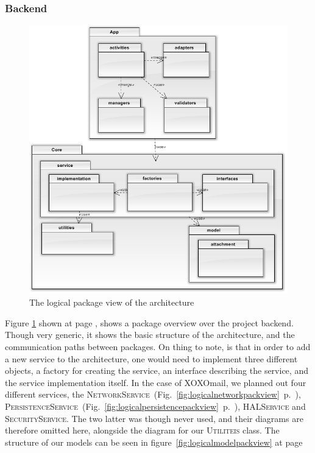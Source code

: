 	\subsubsection{Backend}
\begin{figure}[H]
	\includegraphics[width=\textwidth]{packageDiagram.png}
	\caption{The logical package view of the architecture}
	\label{fig:logicalpackview}
\end{figure}
Figure \ref{fig:logicalpackview} shown at page \pageref{fig:logicalpackview}, shows a package overview over the project backend. Though very generic, it shows the basic structure of the architecture, and the communication paths between packages. On thing to note, is that in order to add a new service to the architecture, one would need to implement three different objects, a factory for creating the service, an interface describing the service, and the service implementation itself. In the case of XOXOmail, we planned out four different services, the \textsc{NetworkService}~(Fig.~\ref{fig:logicalnetworkpackview}~p.~\pageref{fig:logicalnetworkpackview}), \textsc{PersistenceService}~(Fig.~\ref{fig:logicalpersistencepackview}~p.~\pageref{fig:logicalpersistencepackview}), \textsc{HALService} and \textsc{SecurityService}. The two latter was though never used, and their diagrams are therefore omitted here, alongside the diagram for our \textsc{Utiliteis} class. The structure of our models can be seen in figure~\ref{fig:logicalmodelpackview} at page \pageref{fig:logicalmodelpackview}

